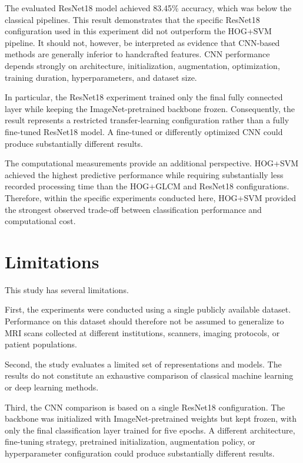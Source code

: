\documentclass[11pt,a4paper]{article}
\begin{document}
The evaluated ResNet18 model achieved 83.45\% accuracy, which was below the classical pipelines. This result demonstrates that the specific ResNet18 configuration used in this experiment did not outperform the HOG+SVM pipeline. It should not, however, be interpreted as evidence that CNN-based methods are generally inferior to handcrafted features. CNN performance depends strongly on architecture, initialization, augmentation, optimization, training duration, hyperparameters, and dataset size.

In particular, the ResNet18 experiment trained only the final fully connected layer while keeping the ImageNet-pretrained backbone frozen. Consequently, the result represents a restricted transfer-learning configuration rather than a fully fine-tuned ResNet18 model. A fine-tuned or differently optimized CNN could produce substantially different results.

The computational measurements provide an additional perspective. HOG+SVM achieved the highest predictive performance while requiring substantially less recorded processing time than the HOG+GLCM and ResNet18 configurations. Therefore, within the specific experiments conducted here, HOG+SVM provided the strongest observed trade-off between classification performance and computational cost.


\section{Limitations}

This study has several limitations.

First, the experiments were conducted using a single publicly available dataset. Performance on this dataset should therefore not be assumed to generalize to MRI scans collected at different institutions, scanners, imaging protocols, or patient populations.

Second, the study evaluates a limited set of representations and models. The results do not constitute an exhaustive comparison of classical machine learning or deep learning methods.

Third, the CNN comparison is based on a single ResNet18 configuration. The backbone was initialized with ImageNet-pretrained weights but kept frozen, with only the final classification layer trained for five epochs. A different architecture, fine-tuning strategy, pretrained initialization, augmentation policy, or hyperparameter configuration could produce substantially different results.
\end{document}

